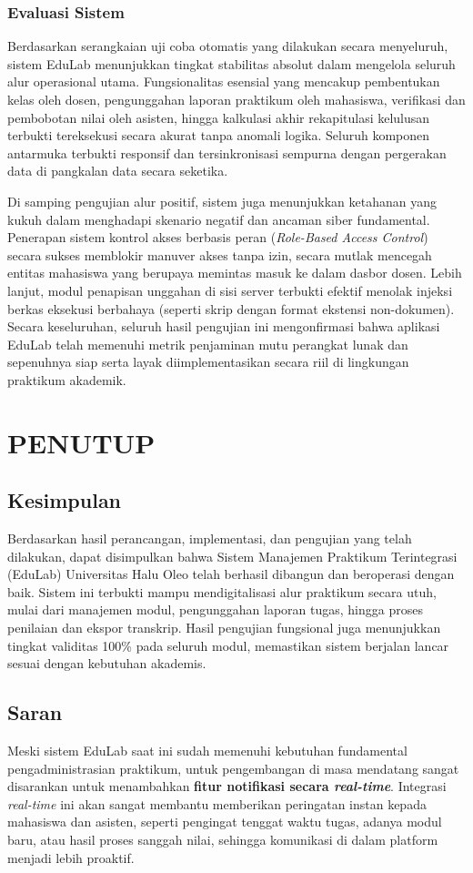 \documentclass[12pt,a4paper,twoside]{report}
\begin{document}
\subsection{Evaluasi Sistem}
Berdasarkan serangkaian uji coba otomatis yang dilakukan secara menyeluruh, sistem EduLab menunjukkan tingkat stabilitas absolut dalam mengelola seluruh alur operasional utama. Fungsionalitas esensial yang mencakup pembentukan kelas oleh dosen, pengunggahan laporan praktikum oleh mahasiswa, verifikasi dan pembobotan nilai oleh asisten, hingga kalkulasi akhir rekapitulasi kelulusan terbukti tereksekusi secara akurat tanpa anomali logika. Seluruh komponen antarmuka terbukti responsif dan tersinkronisasi sempurna dengan pergerakan data di pangkalan data secara seketika.

Di samping pengujian alur positif, sistem juga menunjukkan ketahanan yang kukuh dalam menghadapi skenario negatif dan ancaman siber fundamental. Penerapan sistem kontrol akses berbasis peran (\textit{Role-Based Access Control}) secara sukses memblokir manuver akses tanpa izin, secara mutlak mencegah entitas mahasiswa yang berupaya memintas masuk ke dalam dasbor dosen. Lebih lanjut, modul penapisan unggahan di sisi server terbukti efektif menolak injeksi berkas eksekusi berbahaya (seperti skrip dengan format ekstensi non-dokumen). Secara keseluruhan, seluruh hasil pengujian ini mengonfirmasi bahwa aplikasi EduLab telah memenuhi metrik penjaminan mutu perangkat lunak dan sepenuhnya siap serta layak diimplementasikan secara riil di lingkungan praktikum akademik.
\chapter{PENUTUP}

\section{Kesimpulan}
Berdasarkan hasil perancangan, implementasi, dan pengujian yang telah dilakukan, dapat disimpulkan bahwa Sistem Manajemen Praktikum Terintegrasi (EduLab) Universitas Halu Oleo telah berhasil dibangun dan beroperasi dengan baik. Sistem ini terbukti mampu mendigitalisasi alur praktikum secara utuh, mulai dari manajemen modul, pengunggahan laporan tugas, hingga proses penilaian dan ekspor transkrip. Hasil pengujian fungsional juga menunjukkan tingkat validitas 100\% pada seluruh modul, memastikan sistem berjalan lancar sesuai dengan kebutuhan akademis.

\section{Saran}
Meski sistem EduLab saat ini sudah memenuhi kebutuhan fundamental pengadministrasian praktikum, untuk pengembangan di masa mendatang sangat disarankan untuk menambahkan \textbf{fitur notifikasi secara \textit{real-time}}. Integrasi \textit{real-time} ini akan sangat membantu memberikan peringatan instan kepada mahasiswa dan asisten, seperti pengingat tenggat waktu tugas, adanya modul baru, atau hasil proses sanggah nilai, sehingga komunikasi di dalam platform menjadi lebih proaktif.
\end{document}
